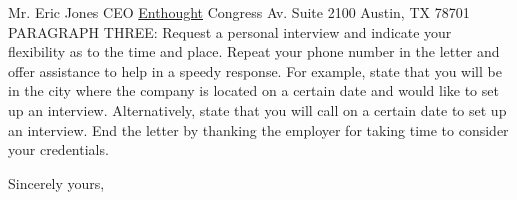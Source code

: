 \documentclass[11pt]{letter} %
\newcommand{\webEnthoughtCompany}{https://www.enthought.com/}
\begin{document}
\begin{letter}{Mr. Eric Jones \newline
CEO \newline
\href{\webEnthoughtCompany}{Enthought}  Congress Av. Suite 2100 \newline
Austin, TX 78701}
PARAGRAPH THREE: Request a personal interview and indicate your flexibility as to the time and place. Repeat your phone number in the letter and offer assistance to help in a speedy response. For example, state that you will be in the city where the company is located on a certain date and would like to set up an interview. Alternatively, state that you will call on a certain date to set up an interview. End the letter by thanking the employer for taking time to consider your credentials. 

\closing{Sincerely yours,}




\end{letter}
\end{document}
